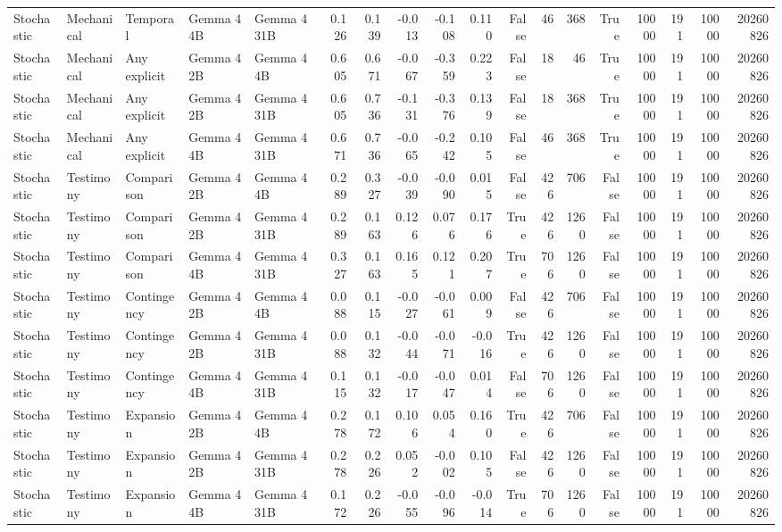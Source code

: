 \begin{tabular}{lllllrrrrrrrrrrrrr}
Stochastic & Mechanical & Temporal & Gemma 4 4B & Gemma 4 31B & 0.126 & 0.139 & -0.013 & -0.108 & 0.110 & False & 46 & 368 & True & 10000 & 191 & 10000 & 20260826 \\
Stochastic & Mechanical & Any explicit & Gemma 4 2B & Gemma 4 4B & 0.605 & 0.671 & -0.067 & -0.359 & 0.223 & False & 18 & 46 & True & 10000 & 191 & 10000 & 20260826 \\
Stochastic & Mechanical & Any explicit & Gemma 4 2B & Gemma 4 31B & 0.605 & 0.736 & -0.131 & -0.376 & 0.139 & False & 18 & 368 & True & 10000 & 191 & 10000 & 20260826 \\
Stochastic & Mechanical & Any explicit & Gemma 4 4B & Gemma 4 31B & 0.671 & 0.736 & -0.065 & -0.242 & 0.105 & False & 46 & 368 & True & 10000 & 191 & 10000 & 20260826 \\
Stochastic & Testimony & Comparison & Gemma 4 2B & Gemma 4 4B & 0.289 & 0.327 & -0.039 & -0.090 & 0.015 & False & 426 & 706 & False & 10000 & 191 & 10000 & 20260826 \\
Stochastic & Testimony & Comparison & Gemma 4 2B & Gemma 4 31B & 0.289 & 0.163 & 0.126 & 0.076 & 0.176 & True & 426 & 1260 & False & 10000 & 191 & 10000 & 20260826 \\
Stochastic & Testimony & Comparison & Gemma 4 4B & Gemma 4 31B & 0.327 & 0.163 & 0.165 & 0.121 & 0.207 & True & 706 & 1260 & False & 10000 & 191 & 10000 & 20260826 \\
Stochastic & Testimony & Contingency & Gemma 4 2B & Gemma 4 4B & 0.088 & 0.115 & -0.027 & -0.061 & 0.009 & False & 426 & 706 & False & 10000 & 191 & 10000 & 20260826 \\
Stochastic & Testimony & Contingency & Gemma 4 2B & Gemma 4 31B & 0.088 & 0.132 & -0.044 & -0.071 & -0.016 & True & 426 & 1260 & False & 10000 & 191 & 10000 & 20260826 \\
Stochastic & Testimony & Contingency & Gemma 4 4B & Gemma 4 31B & 0.115 & 0.132 & -0.017 & -0.047 & 0.014 & False & 706 & 1260 & False & 10000 & 191 & 10000 & 20260826 \\
Stochastic & Testimony & Expansion & Gemma 4 2B & Gemma 4 4B & 0.278 & 0.172 & 0.106 & 0.054 & 0.160 & True & 426 & 706 & False & 10000 & 191 & 10000 & 20260826 \\
Stochastic & Testimony & Expansion & Gemma 4 2B & Gemma 4 31B & 0.278 & 0.226 & 0.052 & -0.002 & 0.105 & False & 426 & 1260 & False & 10000 & 191 & 10000 & 20260826 \\
Stochastic & Testimony & Expansion & Gemma 4 4B & Gemma 4 31B & 0.172 & 0.226 & -0.055 & -0.096 & -0.014 & True & 706 & 1260 & False & 10000 & 191 & 10000 & 20260826 \\

\end{tabular}

